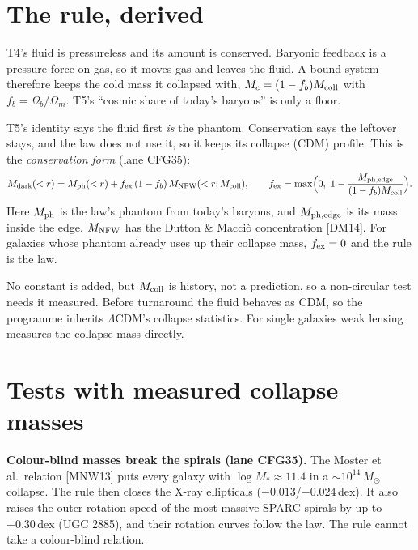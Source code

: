\documentclass[10pt]{article}
\begin{document}
\section{The rule, derived}\label{sec:rule}

T4's fluid is pressureless and its amount is conserved. Baryonic feedback is a pressure force on gas, so it moves gas and leaves the fluid. A bound system therefore keeps the cold mass it collapsed with, $M_c=(1-f_b)M_{\rm coll}$ with $f_b=\Omega_b/\Omega_m$. T5's ``cosmic share of today's baryons'' is only a floor.

T5's identity says the fluid first \emph{is} the phantom. Conservation says the leftover stays, and the law does not use it, so it keeps its collapse (CDM) profile. This is the \emph{conservation form} (lane CFG35):
\begin{equation}
M_{\rm dark}(<r)=M_{\rm ph}(<r)+f_{\rm ex}\,(1-f_b)\,M_{\rm NFW}(<r;M_{\rm coll}),\qquad f_{\rm ex}=\max\!\Big(0,\ 1-\frac{M_{\rm ph,edge}}{(1-f_b)M_{\rm coll}}\Big).\label{eq:rule}
\end{equation}
Here $M_{\rm ph}$ is the law's phantom from today's baryons, and $M_{\rm ph,edge}$ is its mass inside the edge. $M_{\rm NFW}$ has the Dutton \& Macci\`o concentration [DM14]. For galaxies whose phantom already uses up their collapse mass, $f_{\rm ex}=0$ and the rule is the law.

No constant is added, but $M_{\rm coll}$ is history, not a prediction, so a non-circular test needs it measured. Before turnaround the fluid behaves as CDM, so the programme inherits $\Lambda$CDM's collapse statistics. For single galaxies weak lensing measures the collapse mass directly.

\section{Tests with measured collapse masses}\label{sec:tests}

\textbf{Colour-blind masses break the spirals (lane CFG35).} The Moster et al.\ relation [MNW13] puts every galaxy with $\log M_*\approx11.4$ in a $\sim10^{14}\,M_\odot$ collapse. The rule then closes the X-ray ellipticals ($-0.013$/$-0.024$\,dex). It also raises the outer rotation speed of the most massive SPARC spirals by up to $+0.30$\,dex (UGC 2885), and their rotation curves follow the law. The rule cannot take a colour-blind relation.
\end{document}

